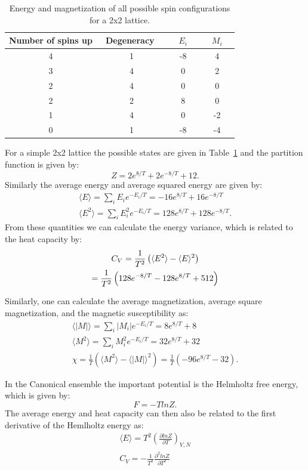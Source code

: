 \documentclass[prc,amsmath,twocolumn,superscriptaddress]{revtex4}
\begin{document}
\begin{table}[b]
\centering
\begin{tabular}{|c|c|c|c|}
\hline
Number of spins up & ~Degeneracy ~& ~ $E_i$ ~& ~ $M_i$ ~\\
\hline
4&1&-8&4\\
3&4&0&2\\
2&4&0&0\\
2&2&8&0\\
1&4&0&-2\\
0&1&-8&-4\\
\hline
\end{tabular}
\caption{Energy and magnetization of all possible spin configurations for a 2x2 lattice.}
\label{states}
\end{table}

For a simple 2x2 lattice the possible states are given in Table~\ref{states} and the partition function is given by:
\begin{equation}
Z = 2e^{8/T}+2e^{-8/T}+12.
\end{equation}
Similarly the average energy and average squared energy are given by:
\begin{gather}
\langle E\rangle= \sum_i E_i e^{-E_i/T} = -16e^{8/T}+16e^{-8/T}\\
\langle E^2\rangle= \sum_i E^2_i e^{-E_i/T} = 128e^{8/T}+128e^{-8/T}.
\end{gather}
From these quantities we can calculate the energy variance, which is related to the heat capacity by:
\begin{gather}
C_V = \frac{1}{T^2} \left(\langle E^2\rangle-\langle E\rangle^2\right) \notag \\
= \frac{1}{T^2} \left(128e^{-8/T}-128e^{8/T}+512\right)
\end{gather}

Similarly, one can calculate the average magnetization, average square magnetization, and the magnetic susceptibility as:
\begin{gather}
\langle |M|\rangle= \sum_i |M_i| e^{-E_i/T} = 8e^{8/T}+8\\
\langle M^2\rangle= \sum_i M^2_i e^{-E_i/T} = 32e^{8/T}+32 \\
\chi = \frac{1}{T} \left(\langle M^2\rangle-\langle |M|\rangle^2\right)= \frac{1}{T} \left(-96e^{8/T}-32\right).
\end{gather}

In the Canonical ensemble the important potential is the Helmholtz free energy, which is given by:
\begin{equation}
F = -TlnZ.
\end{equation}
The average energy and heat capacity can then also be related to the first derivative of the Hemlholtz energy as:
\begin{gather}
\langle E \rangle = T^2\left( \frac{\partial lnZ}{\partial T}\right)_{V,N} \\
C_{V}=-\frac{1}{T^2}\frac{\partial^2 lnZ}{\partial T^2}
\end{gather}
\end{document}

